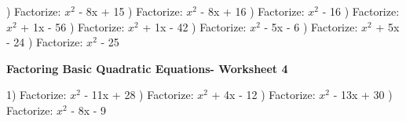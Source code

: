 \documentclass{article}%
\begin{document}
\newline%
\newline%
) Factorize: $x^2$ - 8x + 15%
\newline%
\newline%
) Factorize: $x^2$ - 8x + 16%
\newline%
\newline%
) Factorize: $x^2$ - 16%
\newline%
\newline%
) Factorize: $x^2$ + 1x - 56%
\newline%
\newline%
) Factorize: $x^2$ + 1x - 42%
\newline%
\newline%
) Factorize: $x^2$ - 5x - 6%
\newline%
\newline%
) Factorize: $x^2$ + 5x - 24%
\newline%
\newline%
) Factorize: $x^2$ - 25%
\newline%
\newline%
\newline%
\pagebreak%
\large%
\begin{center}%
\textbf{Factoring Basic Quadratic Equations- Worksheet 4}%
\newline%
\newline%
\newline%
\end{center} \normalsize%
1) Factorize: $x^2$ - 11x + 28%
\newline%
\newline%
) Factorize: $x^2$ + 4x - 12%
\newline%
\newline%
) Factorize: $x^2$ - 13x + 30%
\newline%
\newline%
) Factorize: $x^2$ - 8x - 9%
\newline%
\newline%
\end{document}
